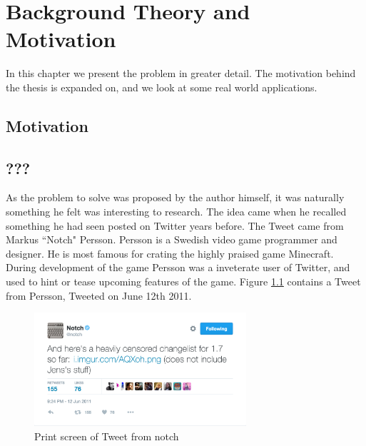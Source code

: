 
\chapter{Background Theory and Motivation}
In this chapter we present the problem in greater detail. The motivation behind the thesis is expanded on, and we look at some real world applications.



\section{Motivation}


\section{???}
As the problem to solve was proposed by the author himself, it was naturally something he felt was interesting to research. The idea came when he recalled something he had seen posted on Twitter years before. The Tweet came from Markus ``Notch" Persson. Persson is a Swedish video game programmer and designer. He is most famous for crating the highly praised game Minecraft. During development of the game Persson was a inveterate user of Twitter, and used to hint or tease upcoming features of the game. Figure \ref{ref:notch_twitter} contains a Tweet from Persson, Tweeted on June 12th 2011.

\begin{figure}[ht]
    \centering
    \includegraphics[width=0.7\textwidth]{fig/chapter1/notch_tweet.png}
    \caption{Print screen of Tweet from notch\protect\footnotemark}
    \label{ref:notch_twitter}
\end{figure}

